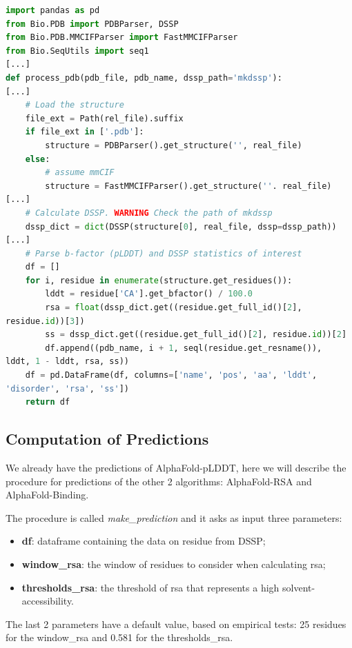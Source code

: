 \vspace{2em}

\begin{lstlisting}[language=Python, caption=Extraction\ residues'\ statistics, label={code:processpdb}]
import pandas as pd
from Bio.PDB import PDBParser, DSSP
from Bio.PDB.MMCIFParser import FastMMCIFParser
from Bio.SeqUtils import seq1
[...]
def process_pdb(pdb_file, pdb_name, dssp_path='mkdssp'):
[...]
    # Load the structure
    file_ext = Path(rel_file).suffix
    if file_ext in ['.pdb']:
        structure = PDBParser().get_structure('', real_file)
    else:
        # assume mmCIF
        structure = FastMMCIFParser().get_structure(''. real_file)
[...]
    # Calculate DSSP. WARNING Check the path of mkdssp
    dssp_dict = dict(DSSP(structure[0], real_file, dssp=dssp_path))
[...]
    # Parse b-factor (pLDDT) and DSSP statistics of interest
    df = []
    for i, residue in enumerate(structure.get_residues()):
        lddt = residue['CA'].get_bfactor() / 100.0
        rsa = float(dssp_dict.get((residue.get_full_id()[2], 
residue.id))[3])
        ss = dssp_dict.get((residue.get_full_id()[2], residue.id))[2]
        df.append((pdb_name, i + 1, seql(residue.get_resname()), 
lddt, 1 - lddt, rsa, ss))
    df = pd.DataFrame(df, columns=['name', 'pos', 'aa', 'lddt', 
'disorder', 'rsa', 'ss'])
    return df
\end{lstlisting}

\subsection{Computation of Predictions}
We already have the predictions of AlphaFold-pLDDT, here we will describe the procedure for predictions of the other 2 algorithms: AlphaFold-RSA and AlphaFold-Binding.

The procedure is called \textit{make\_prediction} and it asks as input three parameters:
\begin{itemize}
    \item \textbf{df}: dataframe containing the data on residue from DSSP;
    \item \textbf{window\_rsa}: the window of residues to consider when calculating rsa;
    \item \textbf{thresholds\_rsa}: the threshold of rsa that represents a high solvent-accessibility.
\end{itemize}
The last 2 parameters have a default value, based on empirical tests: 25 residues for the window\_rsa and 0.581 for the thresholds\_rsa.

